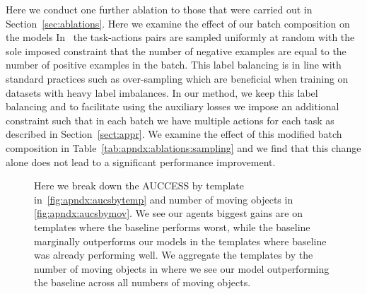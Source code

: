 \documentclass{article}
\begin{document}
Here we conduct one further ablation to those that were carried out in Section~\ref{sec:ablations}.
Here we examine the effect of our batch composition on the models
In~\cite{bakhtin2019phyre} the task-actions pairs are sampled uniformly at random with the sole imposed constraint that the number of negative examples are equal to the number of positive examples in the batch.
This label balancing is in line with standard practices such as over-sampling which are beneficial when training on datasets with heavy label imbalances.
In our method, we keep this label balancing and to facilitate using the auxiliary losses we impose an additional constraint such that in each batch we have multiple actions for each task as described in Section~\ref{sect:appr}.
We examine the effect of this modified batch composition in Table~\ref{tab:apndx:ablations:sampling} and we find that this change alone does not lead to a significant performance improvement.



\begin{figure}[t]
     \hfill
    \hfill
    \caption{Here we break down the AUCCESS by template in~\ref{fig:apndx:aucsbytemp} and number of moving objects in \ref{fig:apndx:aucsbymov}. We see our agents biggest gains are on templates where the baseline performs worst, while the baseline marginally outperforms our models in the templates where baseline was already performing well. We aggregate the templates by the number of moving objects in where we see our model outperforming the baseline across all numbers of moving objects.}\label{fig:apndx:templateBreakdown}
\end{figure}
\end{document}
